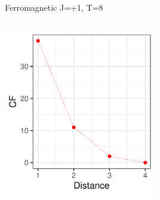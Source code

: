 \documentclass{beamer}
\begin{document}
\begin{frame}{Ferromagnetic J=+1, T=8}
\begin{columns}
\begin{column}{0.5\textwidth}
\begin{center}
     \end{center}
         \begin{center}
     \includegraphics[width=0.5\textwidth]{Pic/J+1_10_6000_T=8_Coherence.pdf}
     \end{center}
\end{column}
\end{columns}
\end{frame}
\end{document}
